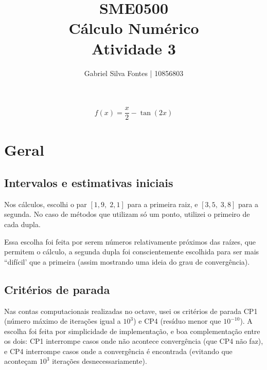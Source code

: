 \documentclass[12pt]{article}
\title{SME0500 \\ Cálculo Numérico \\ Atividade 3}
\author{Gabriel Silva Fontes | 10856803}
\begin{document}
\maketitle

 \[
 f(x) = \frac{x}{2} - \tan{(2x)}
 \]

\begin{center}
\end{center}

\setcounter{section}{-1}
\section{Geral}
\subsection{Intervalos e estimativas iniciais}
Nos cálculos, escolhi o par \([1,9,\; 2,1]\) para a primeira raiz, e \([3,5,\; 3,8]\) para a segunda. No caso de métodos que utilizam só um ponto, utilizei o primeiro de cada dupla.

Essa escolha foi feita por serem números relativamente próximos das raízes, que permitem o cálculo, a segunda dupla foi conscientemente escolhida para ser mais ``difícil' que a primeira (assim mostrando uma ideia do grau de convergência).

\subsection{Critérios de parada}

Nas contas computacionais realizadas no octave, usei os critérios de parada CP1 (número máximo de iterações igual a \(10^3\)) e CP4 (resíduo menor que \(10^{-10}\)). A escolha foi feita por simplicidade de implementação, e boa complementação entre os dois: CP1 interrompe casos onde não acontece convergência (que CP4 não faz), e CP4 interrompe casos onde a convergência é encontrada (evitando que aconteçam \(10^3\) iterações desnecessariamente).
\end{document}
